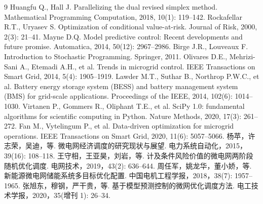 \documentclass[withoutpreface]{cumcmthesis}
\begin{document}
\begin{thebibliography}{9}
    Huangfu Q., Hall J.
    \newblock Parallelizing the dual revised simplex method.
    \newblock Mathematical Programming Computation, 2018, 10(1): 119--142.
    Rockafellar R.T., Uryasev S.
    \newblock Optimization of conditional value-at-risk.
    \newblock Journal of Risk, 2000, 2(3): 21--41.
    Mayne D.Q.
    \newblock Model predictive control: Recent developments and future promise.
    \newblock Automatica, 2014, 50(12): 2967--2986.
    Birge J.R., Louveaux F.
    \newblock Introduction to Stochastic Programming.
    \newblock Springer, 2011.
    Olivares D.E., Mehrizi-Sani A., Etemadi A.H., et al.
    \newblock Trends in microgrid control.
    \newblock IEEE Transactions on Smart Grid, 2014, 5(4): 1905--1919.
    Lawder M.T., Suthar B., Northrop P.W.C., et al.
    \newblock Battery energy storage system (BESS) and battery management system (BMS) for
    grid-scale applications.
    \newblock Proceedings of the IEEE, 2014, 102(6): 1014--1030.
    Virtanen P., Gommers R., Oliphant T.E., et al.
    \newblock SciPy 1.0: fundamental algorithms for scientific computing in Python.
    \newblock Nature Methods, 2020, 17(3): 261--272.
    Fan M., Vytelingum P., et al.
    \newblock Data-driven optimization for microgrid operations.
    \newblock IEEE Transactions on Smart Grid, 2020, 11(6): 5057--5066.
    杨苹，许志荣，吴迪，等.
    \newblock 微电网经济调度的研究现状与展望.
    \newblock 电力系统自动化，2015，39(16): 108--118.
    王守相，王亚昊，刘岩，等.
    \newblock 计及条件风险价值的微电网两阶段随机优化调度.
    \newblock 电网技术，2019，43(2): 636--644.
    周任军，姚龙华，董小娇，等.
    \newblock 新能源微电网储能系统多目标优化配置.
    \newblock 中国电机工程学报，2018，38(7): 1957--1965.
    张旭东，穆钢，严干贵，等.
    \newblock 基于模型预测控制的微网优化调度方法.
    \newblock 电工技术学报，2020，35(增刊 1): 26--34.
\end{thebibliography}
\end{document}
